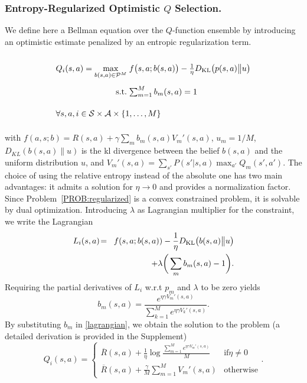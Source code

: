 \subsubsection{Entropy-Regularized Optimistic $Q$ Selection.}
We define here a Bellman equation over the $Q$-function ensemble by introducing an optimistic estimate penalized by an entropic regularization term.
\begin{probdef}
\begin{equation}
\arraycolsep=1.4pt\def\arraystretch{2.2}
\begin{array}{rrclcl}
\displaystyle Q_i(s,a) = \max_{b(s,a) \in \mathcal{P}^M} & \multicolumn{3}{l}{f\big(s,a;b(s,a)\big)-\frac{1}{\eta}D_{\mathrm{KL}}\big(p(s,a)\big{\|}u\big) } \\
\textrm{s.t.} & \sum_{m=1}^{M} b_m(s,a) & = & 1 \\
\multicolumn{4}{l}{ \forall s,a,i \in \mathcal{S} \times \mathcal{A} \times \{1,\dots,M\}}
\end{array}\nonumber
\end{equation}\label{PROB:regularized}
\end{probdef}
\noindent with $f(a,s;b)\! =\! R(s,a) + \gamma \sum_m{b}_m(s,a)V_m'(s,a)$, $u_m  =  1/M$, $D_{KL}(b(s,a)\| u)$ is the \gls{kl} divergence between the belief $b(s,a)$ and the uniform distribution $u$, and $V_m'(s,a) \! = \! \sum_{s'} P(s'|s,a)\max_{a'}Q_m(s',a')$.
The choice of using the relative entropy instead of the absolute one has two main advantages: it admits a solution for $\eta \to 0$ and provides a normalization factor.
Since Problem~\ref{PROB:regularized} is a convex constrained problem, it is solvable by dual optimization. Introducing $\lambda$ as Lagrangian multiplier for the constraint, we write the Lagrangian
\begin{eqnarray}
L_i(s,a) \!&=& \!f(s,a; b(s,a)) -\frac{1}{\eta}D_{\mathrm{KL}}\big(b(s,a)\big{\|}u\big)\nonumber \\ && + \lambda\bigg(\sum_m b_m(s,a) - 1\bigg). \label{lagrangian}
\end{eqnarray}
Requiring the partial derivatives of $L_i$ w.r.t $p_m$ and $\lambda$ to be zero yields 
\begin{equation}
b_m(s,a) = \frac{e^{\eta  \gamma V_m'(s,a)}}{\sum_{k=1}^{M} e^{\eta \gamma   V_k'(s,a)}}\label{pm}.
\end{equation} 
By substituting $b_m$ in \eqref{lagrangian}, we obtain the solution to the problem (a detailed derivation is provided in the Supplement)
\begin{equation}
Q_i(s,a) = \begin{cases}
\overline{R}(s,a) + \frac{1}{\eta} \log \frac{\sum_{m=1}^Me^{\eta \gamma  V_m'(s,a) }}{M} & \mathrm{if} \eta \neq 0 \label{OBE} \\
\overline{R}(s,a) + \frac{\gamma}M \sum_{m=1}^{M} V_m'(s,a) & \mathrm{otherwise}
\end{cases}.
\end{equation}

